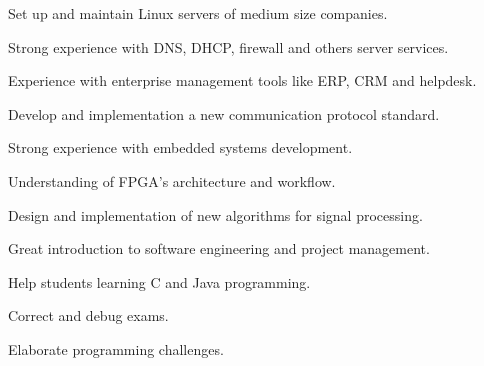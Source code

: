 \documentclass[]{willianpaixao-resume}
\begin{document}
\begin{minipage}[t]{0.64\textwidth}
\begin{tightemize}
\item Set up and maintain Linux servers of medium size companies.
\item Strong experience with DNS, DHCP, firewall and others server services.
\item Experience with enterprise management tools like ERP, CRM and helpdesk.
\end{tightemize}
\sectionsep

\begin{tightemize}
\item Develop and implementation a new communication protocol standard.
\item Strong experience with embedded systems development.
\item Understanding of FPGA's architecture and workflow.
\end{tightemize}
\sectionsep

\begin{tightemize}
    \item Design and implementation of new algorithms for signal processing.
    \item Great introduction to software engineering and project management.
\end{tightemize}
\sectionsep

\begin{tightemize}
    \item Help students learning C and Java programming.
    \item Correct and debug exams.
    \item Elaborate programming challenges.
\end{tightemize}
\sectionsep
\end{minipage} 
\end{document}
